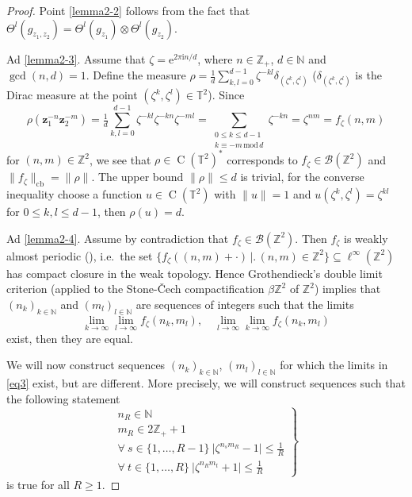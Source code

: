 \documentclass[12pt,reqno,a4paper]{amsart}
\theoremstyle{definition}
\newcommand{\ee}{\mathrm{e}}
\newcommand{\ii}{\mathrm{i}}
\newcommand{\tens}{\otimes}
\newcommand{\NN}{\mathbb{N}}
\newcommand{\TT}{\mathbb{T}}
\newcommand{\ZZ}{\mathbb{Z}}
\newcommand{\bz}{{\boldsymbol{z}}}
\DeclareMathOperator{\C}{C}
\DeclareMathOperator{\cb}{cb}
\numberwithin{equation}{section}
\begin{document}
\begin{appendices}
\begin{proof}
Point \eqref{lemma2-2} follows from the fact that $\Theta^l(g_{z_1,z_2})=\Theta^l(g_{z_1})\tens\Theta^l(g_{z_2})$.

Ad \eqref{lemma2-3}. Assume that $\zeta=\ee^{2\pi\ii n/d}$, where $n\in\ZZ_+$, $d\in\NN$ and $\gcd(n,d)=1$. Define the measure $\rho=\tfrac{1}{d}\sum\limits_{k,l=0}^{d-1}\zeta^{-kl}\delta_{(\zeta^k,\zeta^l)}$ ($\delta_{(\zeta^k,\zeta^l)}$ is the Dirac measure at the point $(\zeta^k,\zeta^l)\in\TT^2$). Since
\[
\rho(\bz_1^{-n} \bz_2^{-m})=
\tfrac{1}{d}
\sum_{k,l=0}^{d-1} \zeta^{-kl} \zeta^{-kn} \zeta^{-ml}=
\sum_{\substack{0\leq k\leq d-1\\k\equiv-m\,\text{mod}\,d}}
\zeta^{-kn}
=\zeta^{nm}=f_\zeta(n,m)
\]
for $(n,m)\in\ZZ^2$, we see that $\rho\in\C(\TT^2)^*$ corresponds to $f_\zeta\in\mathcal{B}(\ZZ^2)$ and $\|f_\zeta\|_{\cb}=\|\rho\|$. The upper bound $\|\rho\|\le d$ is  trivial, for the converse inequality choose a function $u\in \C(\TT^2)$ with $\|u\|=1$ and $u(\zeta^k,\zeta^l)=\zeta^{kl}$ for $0\le k,l\le d-1$, then $\rho(u)=d$.

Ad \eqref{lemma2-4}.
Assume by contradiction that $f_\zeta\in\mathcal{B}(\ZZ^2)$. Then $f_\zeta$ is weakly almost periodic (\cite[Proposition D.8]{KerrLi}), i.e.~the set $\bigl\{f_\zeta((n,m)+\cdot)\,\bigr|\bigl.\,(n,m)\in\ZZ^2\bigr\}\subseteq\ell^{\infty}(\ZZ^2)$ has compact closure in the weak topology. Hence Grothendieck's double limit criterion \cite[Theorem D.4]{KerrLi} (applied to the Stone-\v{C}ech compactification $\beta\ZZ^2$ of $\ZZ^2$) implies that $(n_k)_{k\in\NN}$ and $(m_l)_{l\in\NN}$ are sequences of integers such that the limits
\begin{equation}\label{eq3}
\lim_{k\to\infty}\lim_{l\to\infty}f_\zeta(n_k,m_l),\quad 
\lim_{l\to\infty}\lim_{k\to\infty}f_\zeta(n_k,m_l)
\end{equation}
exist, then they are equal.

We will now construct sequences $(n_k)_{k\in\NN}$, $(m_l)_{l\in\NN}$ for which the limits in \eqref{eq3} exist, but are different. More precisely, we will construct sequences such that the following statement
\[
\left.\begin{array}{l}
n_R\in\NN\\[2pt]
m_R\in 2\ZZ_++1\\[2pt]
\forall\:s\in\{1,\dotsc,R-1\}\ \bigl|\zeta^{n_sm_R}-1\bigr|\leq\tfrac{1}{R}\\[2pt]
\forall\:t\in\{1,\dotsc,R\}\ \bigl|\zeta^{n_Rm_t}+1\bigr|\leq\tfrac{1}{R}
\end{array}\right\}
\tag{$\star_R$}
\]
is true for all $R\ge 1$.


\end{proof}
\end{appendices}
\end{document}
